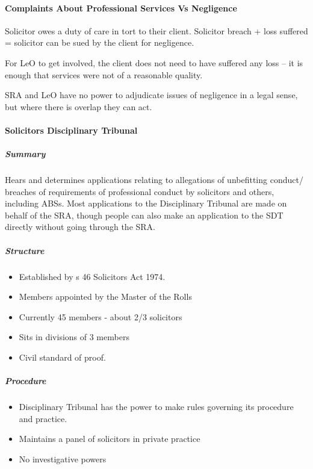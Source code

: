 \documentclass[
]{article}
\providecommand{\tightlist}{%
  \setlength{\itemsep}{0pt}\setlength{\parskip}{0pt}}
\begin{document}
\hypertarget{complaints-about-professional-services-vs-negligence}{%
\paragraph{Complaints About Professional Services Vs
Negligence}\label{complaints-about-professional-services-vs-negligence}}

Solicitor owes a duty of care in tort to their client. Solicitor breach
+ loss suffered = solicitor can be sued by the client for negligence.

For LeO to get involved, the client does not need to have suffered any
loss -- it is enough that services were not of a reasonable quality.

SRA and LeO have no power to adjudicate issues of negligence in a legal
sense, but where there is overlap they can act.

\hypertarget{solicitors-disciplinary-tribunal}{%
\paragraph{Solicitors Disciplinary
Tribunal}\label{solicitors-disciplinary-tribunal}}

\hypertarget{summary}{%
\subparagraph{Summary}\label{summary}}

Hears and determines applications relating to allegations of unbefitting
conduct/ breaches of requirements of professional conduct by solicitors
and others, including ABSs. Most applications to the Disciplinary
Tribunal are made on behalf of the SRA, though people can also make an
application to the SDT directly without going through the SRA.

\hypertarget{structure}{%
\subparagraph{Structure}\label{structure}}

\begin{itemize}
\tightlist
\item
  Established by s 46 Solicitors Act 1974.
\item
  Members appointed by the Master of the Rolls
\item
  Currently 45 members - about 2/3 solicitors
\item
  Sits in divisions of 3 members
\item
  Civil standard of proof.
\end{itemize}

\hypertarget{procedure}{%
\subparagraph{Procedure}\label{procedure}}

\begin{itemize}
\tightlist
\item
  Disciplinary Tribunal has the power to make rules governing its
  procedure and practice.
\item
  Maintains a panel of solicitors in private practice
\item
  No investigative powers
\end{itemize}
\end{document}
